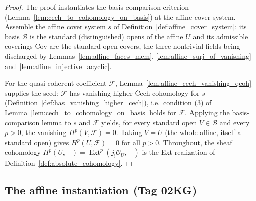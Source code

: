 \begin{proof}
  The proof instantiates the basis-comparison criterion
  (Lemma~\ref{lem:cech_to_cohomology_on_basis}) at the affine cover system. Assemble the affine cover
  system \(s\) of Definition~\ref{def:affine_cover_system}: its basis \(\mathcal{B}\) is the
  standard (distinguished) opens of the affine \(U\) and its admissible coverings \(\mathrm{Cov}\) are
  the standard open covers, the three nontrivial fields being discharged by
  Lemmas~\ref{lem:affine_faces_mem}, \ref{lem:affine_surj_of_vanishing}
  and~\ref{lem:affine_injective_acyclic}.

  For the quasi-coherent coefficient \(\mathcal{F}\), Lemma~\ref{lem:affine_cech_vanishing_qcoh}
  supplies the seed: \(\mathcal{F}\) has vanishing higher {\v C}ech cohomology for \(s\)
  (Definition~\ref{def:has_vanishing_higher_cech}), i.e.\ condition (3) of
  Lemma~\ref{lem:cech_to_cohomology_on_basis} holds for \(\mathcal{F}\). Applying the
  basis-comparison lemma to \(s\) and \(\mathcal{F}\) yields, for every standard open
  \(V \in \mathcal{B}\) and every \(p > 0\), the vanishing \(H^p(V, \mathcal{F}) = 0\). Taking
  \(V = U\) (the whole affine, itself a standard open) gives \(H^p(U, \mathcal{F}) = 0\) for all
  \(p > 0\). Throughout, the sheaf cohomology \(H^p(U, -) = \operatorname{Ext}^p(j_!\mathcal{O}_U, -)\)
  is the Ext realization of Definition~\ref{def:absolute_cohomology}.
\end{proof}

\subsection{The affine instantiation (Tag 02KG)}

